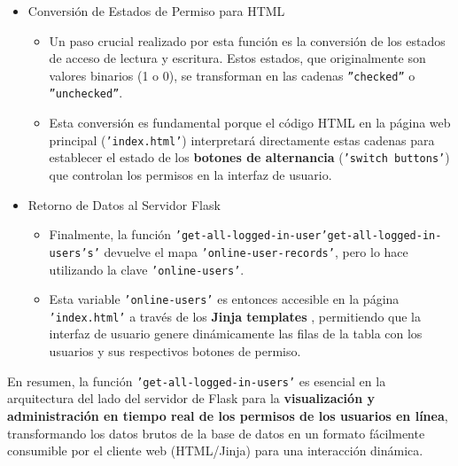 \documentclass{report}
\begin{document}
\begin{itemize}
    \item Conversión de Estados de Permiso para HTML
        \begin{itemize}
            \item Un paso crucial realizado por esta función es la conversión de los estados de acceso de lectura y escritura. Estos estados, que originalmente 
            son valores binarios (1 o 0), se transforman en las cadenas \texttt{''checked''} o \texttt{''unchecked''}.
            \item Esta conversión es fundamental porque el código HTML en la página web principal (\texttt{'index.html'}) interpretará directamente estas 
            cadenas para establecer el estado de los \textbf{botones de alternancia} (\texttt{'switch buttons'}) que controlan los permisos en la interfaz 
            de usuario.
        \end{itemize}

    \item Retorno de Datos al Servidor Flask
        \begin{itemize}
            \item Finalmente, la función \texttt{'get-all-logged-in-user'get-all-logged-in-users's'} devuelve el mapa \texttt{'online-user-records'}, 
            pero lo hace utilizando la clave \texttt{'online-users'}.
            \item Esta variable \texttt{'online-users'} es entonces accesible en la página \texttt{'index.html'} a través de los \textbf{ Jinja templates }, 
            permitiendo que la interfaz de usuario genere dinámicamente las filas de la tabla con los usuarios y sus respectivos botones de permiso.
        \end{itemize}
\end{itemize}

En resumen, la función \texttt{'get-all-logged-in-users'} es esencial en la arquitectura del lado del servidor de Flask para la \textbf{visualización y 
administración en tiempo real de los permisos de los usuarios en línea}, transformando los datos brutos de la base de datos en un formato fácilmente 
consumible por el cliente web (HTML/Jinja) para una interacción dinámica.
\end{document}
